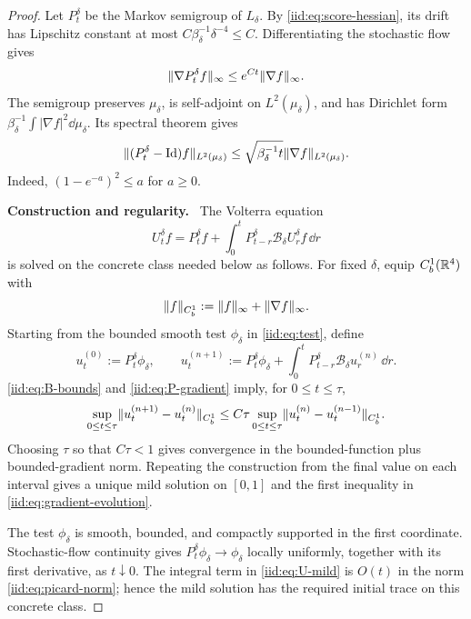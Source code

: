 \documentclass[11pt,reqno]{amsart}
\numberwithin{equation}{section}
\theoremstyle{plain}
\theoremstyle{remark}
\DeclarePairedDelimiter{\norm}{\lVert}{\rVert}
\newcommand{\parheading}[1]{\par\medskip\noindent\textbf{#1}\ }
\newcommand{\Id}{\mathrm{Id}}
\begin{document}
\begin{proof}
Let $P_t^\delta$ be the Markov semigroup of $L_\delta$. By \eqref{iid:eq:score-hessian}, its drift has Lipschitz constant at most $C\beta_\delta^{-1}\delta^{-4}\le C$. Differentiating the stochastic flow gives
\begin{equation}\label{iid:eq:P-gradient}
 \norm{\nabla P_t^\delta f}_\infty\le e^{Ct}\norm{\nabla f}_\infty.
\end{equation}
The semigroup preserves $\mu_\delta$, is self-adjoint on $L^2(\mu_\delta)$, and has Dirichlet form $\beta_\delta^{-1}\int|\nabla f|^2\dd\mu_\delta$. Its spectral theorem gives
\begin{equation}\label{iid:eq:P-difference}
 \norm{(P_t^\delta-\Id)f}_{L^2(\mu_\delta)}
 \le\sqrt{\beta_\delta^{-1} t}\norm{\nabla f}_{L^2(\mu_\delta)}.
\end{equation}
Indeed, $(1-e^{-a})^2\le a$ for $a\ge0$.

\parheading{Construction and regularity.}
The Volterra equation
\begin{equation}\label{iid:eq:U-mild}
 U_t^\delta f=P_t^\delta f+
 \int_0^tP_{t-r}^\delta \mathcal B_\delta U_r^\delta f\,\dd r
\end{equation}
is solved on the concrete class needed below as follows. For fixed $\delta$, equip $C_b^1(\mathbb R^4)$ with
\begin{equation}\label{iid:eq:picard-norm}
 \norm{f}_{C_b^1}:=\norm{f}_\infty+\norm{\nabla f}_\infty.
\end{equation}
Starting from the bounded smooth test $\phi_\delta$ in \eqref{iid:eq:test}, define
\begin{equation}\label{iid:eq:picard-iterates}
 u^{(0)}_t:=P_t^\delta\phi_\delta,
 \qquad
 u^{(n+1)}_t:=P_t^\delta\phi_\delta
 +\int_0^tP_{t-r}^\delta \mathcal B_\delta u^{(n)}_r\,\dd r.
\end{equation}
\eqref{iid:eq:B-bounds} and \eqref{iid:eq:P-gradient} imply, for $0\le t\le\tau$,
\begin{equation}\label{iid:eq:picard-contraction}
 \sup_{0\le t\le\tau}
 \norm{u^{(n+1)}_t-u^{(n)}_t}_{C_b^1}
 \le C\tau
 \sup_{0\le t\le\tau}
 \norm{u^{(n)}_t-u^{(n-1)}_t}_{C_b^1}.
\end{equation}
Choosing $\tau$ so that $C\tau<1$ gives convergence in the bounded-function plus bounded-gradient norm. Repeating the construction from the final value on each interval gives a unique mild solution on $[0,1]$ and the first inequality in \eqref{iid:eq:gradient-evolution}.

The test $\phi_\delta$ is smooth, bounded, and compactly supported in the first coordinate. Stochastic-flow continuity gives $P_t^\delta\phi_\delta\to\phi_\delta$ locally uniformly, together with its first derivative, as $t\downarrow0$. The integral term in \eqref{iid:eq:U-mild} is $O(t)$ in the norm \eqref{iid:eq:picard-norm}; hence the mild solution has the required initial trace on this concrete class.


\end{proof}
\end{document}
